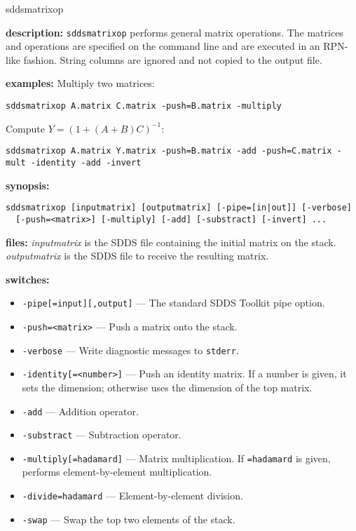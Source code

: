 \begin{sddsprog}{sddsmatrixop}
  \item \textbf{description:}
  \verb|sddsmatrixop| performs general matrix operations. The matrices and operations are
  specified on the command line and are executed in an RPN-like fashion. String columns are
  ignored and not copied to the output file.
  \item \textbf{examples:}
  Multiply two matrices:
    \begin{verbatim}
sddsmatrixop A.matrix C.matrix -push=B.matrix -multiply
    \end{verbatim}
  Compute $Y = (1 + (A+B)C)^{-1}$:
    \begin{verbatim}
sddsmatrixop A.matrix Y.matrix -push=B.matrix -add -push=C.matrix -mult -identity -add -invert
    \end{verbatim}
  \item \textbf{synopsis:}
    \begin{verbatim}
sddsmatrixop [inputmatrix] [outputmatrix] [-pipe=[in|out]] [-verbose]
  [-push=<matrix>] [-multiply] [-add] [-substract] [-invert] ...
    \end{verbatim}
  \item \textbf{files:}
  \emph{inputmatrix} is the SDDS file containing the initial matrix on the stack.
  \emph{outputmatrix} is the SDDS file to receive the resulting matrix.
  \item \textbf{switches:}
    \begin{itemize}
      \item \verb|-pipe[=input][,output]| --- The standard SDDS Toolkit pipe option.
      \item \verb|-push=<matrix>| --- Push a matrix onto the stack.
      \item \verb|-verbose| --- Write diagnostic messages to \verb|stderr|.
      \item \verb|-identity[=<number>]| --- Push an identity matrix. If a number is given, it sets the
        dimension; otherwise uses the dimension of the top matrix.
      \item \verb|-add| --- Addition operator.
      \item \verb|-substract| --- Subtraction operator.
      \item \verb|-multiply[=hadamard]| --- Matrix multiplication. If \verb|=hadamard| is given,
        performs element-by-element multiplication.
      \item \verb|-divide=hadamard| --- Element-by-element division.
      \item \verb|-swap| --- Swap the top two elements of the stack.

\end{itemize}
\end{sddsprog}
